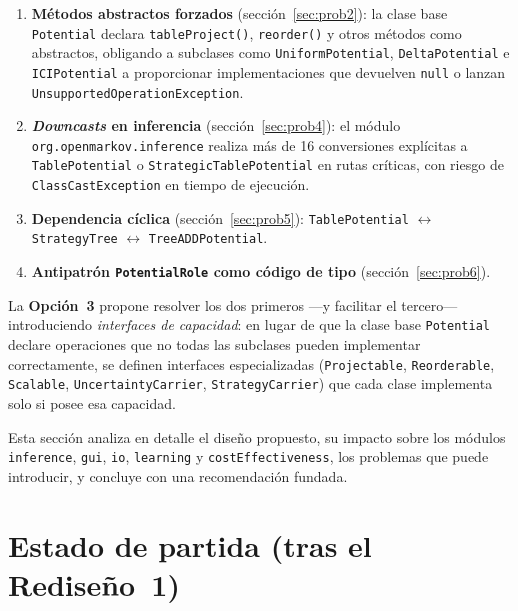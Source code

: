 \documentclass[11pt,a4paper]{article}
\newcommand{\code}[1]{\texttt{#1}}
\begin{document}
\begin{enumerate}
  \item \textbf{Métodos abstractos forzados} (sección~\ref{sec:prob2}): la
        clase base \code{Potential} declara \code{tableProject()}, \code{reorder()}
        y otros métodos como abstractos, obligando a subclases como
        \code{UniformPotential}, \code{DeltaPotential} e \code{ICIPotential} a
        proporcionar implementaciones que devuelven \code{null} o lanzan
        \code{UnsupportedOperationException}.

  \item \textbf{\emph{Downcasts} en inferencia} (sección~\ref{sec:prob4}): el
        módulo \code{org.openmarkov.inference} realiza más de 16 conversiones
        explícitas a \code{TablePotential} o \code{StrategicTablePotential} en
        rutas críticas, con riesgo de \code{ClassCastException} en tiempo de
        ejecución.

  \item \textbf{Dependencia cíclica} (sección~\ref{sec:prob5}):
        \code{Table\-Potential} $\leftrightarrow$ \code{StrategyTree}
        $\leftrightarrow$ \code{Tree\-ADD\-Potential}.

  \item \textbf{Antipatrón \code{PotentialRole} como código de tipo}
        (sección~\ref{sec:prob6}).
\end{enumerate}

La \textbf{Opción~3} propone resolver los dos primeros ---y facilitar el
tercero--- introduciendo \emph{interfaces de capacidad}: en lugar de que la clase
base \code{Potential} declare operaciones que no todas las subclases pueden
implementar correctamente, se definen interfaces especializadas
(\code{Projectable}, \code{Reorderable}, \code{Scalable}, \code{UncertaintyCarrier},
\code{StrategyCarrier}) que cada clase implementa solo si posee esa capacidad.

Esta sección analiza en detalle el diseño propuesto, su impacto sobre los
módulos \code{inference}, \code{gui}, \code{io}, \code{learning} y
\code{costEffectiveness}, los problemas que puede introducir, y concluye con una
recomendación fundada.

\section{Estado de partida (tras el Rediseño~1)}
\label{sec:op3-partida}
\end{document}
